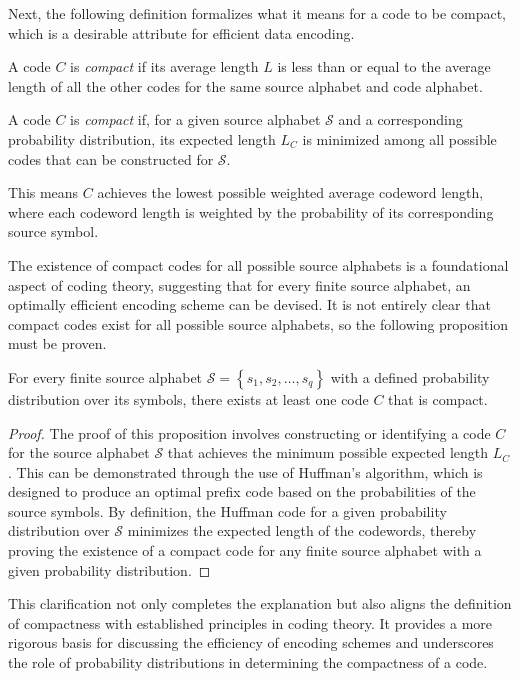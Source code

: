 Next, the following definition formalizes what it means for a code to be compact, which is a desirable attribute for efficient data encoding.

\begin{definition}
A code $C$ is \emph{compact} if its average length $L$ is less than or equal to the average length of all the other codes for the same source alphabet and code alphabet.
\end{definition}

\begin{definition}
A code $C$ is \emph{compact} if, for a given source alphabet $\mathcal{S}$ and a corresponding probability distribution, its expected length $L_{C}$ is minimized among all possible codes that can be constructed for $\mathcal{S}$.
\end{definition}

This means $C$ achieves the lowest possible weighted average codeword length, where each codeword length is weighted by the probability of its corresponding source symbol.

The existence of compact codes for all possible source alphabets is a foundational aspect of coding theory, suggesting that for every finite source alphabet, an optimally efficient encoding scheme can be devised. It is not entirely clear that compact codes exist for all possible source alphabets, so the following proposition must be proven.

\begin{proposition}
For every finite source alphabet $\mathcal{S}=\left\{ s_{1},s_{2},\ldots,s_{q}\right\}$ with a defined probability distribution over its symbols, there exists at least one code $C$ that is compact.
\end{proposition}
\begin{proof}
The proof of this proposition involves constructing or identifying a code $C$ for the source alphabet $\mathcal{S}$ that achieves the minimum possible expected length $L_{C}$. This can be demonstrated through the use of Huffman's algorithm, which is designed to produce an optimal prefix code based on the probabilities of the source symbols. By definition, the Huffman code for a given probability distribution over $\mathcal{S}$ minimizes the expected length of the codewords, thereby proving the existence of a compact code for any finite source alphabet with a given probability distribution.
\end{proof}

This clarification not only completes the explanation but also aligns the definition of compactness with established principles in coding theory. It provides a more rigorous basis for discussing the efficiency of encoding schemes and underscores the role of probability distributions in determining the compactness of a code.


